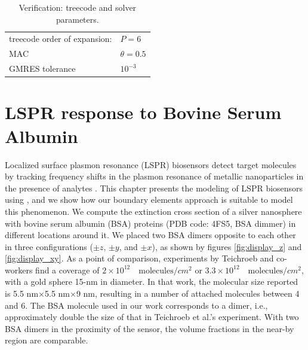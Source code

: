 \begin{table}%
    \centering
    \caption{\label{table:treeparams2} Verification: treecode and solver parameters.} 
    \begin{tabular}{l l}
    \hline%
    treecode order of expansion: & $P=6$\\
    MAC                                         & $\theta=0.5$\\
    GMRES tolerance                    & $10^{-3}$\\
    \hline%
    \end{tabular}
\end{table}

\section{LSPR response to Bovine Serum Albumin} \label{sec:lspr_response_bsa}

Localized surface plasmon resonance (LSPR) biosensors detect target molecules
by tracking frequency shifts in the plasmon resonance of metallic nanoparticles
in the presence of analytes \cite{WilletsVandyune2007}. This chapter presents the 
modeling of LSPR biosensors using \pygbe, and we show how our boundary elements approach is 
suitable to model this phenomenon. We compute the extinction cross section 
of a silver nanosphere with bovine serum albumin (BSA) proteins (PDB code: 4FS5,
BSA dimmer) in different locations around it. We placed two BSA dimers opposite to each other 
in three configurations ($\pm z$, $\pm y$, and $\pm x$), as shown by figures \ref{fig:display_z} and \ref{fig:display_xy}.
As a point of comparison, experiments by Teichroeb and co-workers
\cite{TeichroebETal2008} find a coverage of $2\times 10^{12} \quad \text{molecules}/cm^2$ or $3.3\times 10^{12} \quad \text{molecules}/cm^2$, 
with a gold sphere 15-nm in diameter. In that work, the molecular size reported is 5.5 nm$\times$5.5 nm$\times$9 nm, resulting in
a number of attached molecules between 4 and 6. The BSA molecule used in our work corresponds to a dimer, i.e., approximately 
double the size of that in Teichroeb et al.'s experiment. With two BSA dimers in the proximity of the sensor, 
the volume fractions in the near-by region are comparable.


